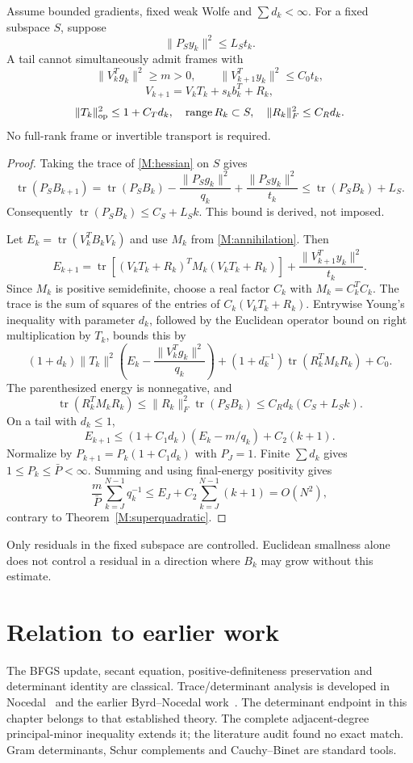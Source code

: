 \begin{theorem}\label{M:residualtheorem}
Assume bounded gradients, fixed weak Wolfe and $\sum d_k<\infty$. For a fixed subspace $S$, suppose
\[
 \|P_Sy_k\|^2\le L_St_k.
\]
A tail cannot simultaneously admit frames with
\[
 \|V_k^Tg_k\|^2\ge m>0,\qquad\|V_{k+1}^Ty_k\|^2\le C_0t_k,
\]
\[
 V_{k+1}=V_kT_k+s_kb_k^T+R_k,
\]
\[
 \|T_k\|_{\rm op}^2\le1+C_Td_k,\quad\operatorname{range}R_k\subset S,
 \quad\|R_k\|_F^2\le C_Rd_k.
\]
No full-rank frame or invertible transport is required.
\end{theorem}
\begin{proof}
Taking the trace of \eqref{M:hessian} on $S$ gives
\[
 \operatorname{tr}(P_SB_{k+1})
 =\operatorname{tr}(P_SB_k)-\frac{\|P_Sg_k\|^2}{q_k}
 +\frac{\|P_Sy_k\|^2}{t_k}
 \le\operatorname{tr}(P_SB_k)+L_S.
\]
Consequently $\operatorname{tr}(P_SB_k)\le C_S+L_Sk$. This bound is derived, not imposed.

Let $E_k=\operatorname{tr}(V_k^TB_kV_k)$ and use $M_k$ from \eqref{M:annihilation}. Then
\[
 E_{k+1}=\operatorname{tr}\!\left[(V_kT_k+R_k)^TM_k(V_kT_k+R_k)\right]
 +\frac{\|V_{k+1}^Ty_k\|^2}{t_k}.
\]
Since $M_k$ is positive semidefinite, choose a real factor $C_k$ with $M_k=C_k^TC_k$. The trace is the sum of squares of the entries of $C_k(V_kT_k+R_k)$. Entrywise Young's inequality with parameter $d_k$, followed by the Euclidean operator bound on right multiplication by $T_k$, bounds this by
\[
 (1+d_k)\|T_k\|^2\left(E_k-\frac{\|V_k^Tg_k\|^2}{q_k}\right)
 +(1+d_k^{-1})\operatorname{tr}(R_k^TM_kR_k)+C_0.
\]
The parenthesized energy is nonnegative, and
\[
 \operatorname{tr}(R_k^TM_kR_k)
 \le\|R_k\|_F^2\operatorname{tr}(P_SB_k)
 \le C_Rd_k(C_S+L_Sk).
\]
On a tail with $d_k\le1$,
\[
 E_{k+1}\le(1+C_1d_k)(E_k-m/q_k)+C_2(k+1).
\]
Normalize by $P_{k+1}=P_k(1+C_1d_k)$ with $P_J=1$. Finite $\sum d_k$ gives $1\le P_k\le\bar P<\infty$. Summing and using final-energy positivity gives
\[
 \frac m{\bar P}\sum_{k=J}^{N-1}q_k^{-1}
 \le E_J+C_2\sum_{k=J}^{N-1}(k+1)=O(N^2),
\]
contrary to Theorem~\ref{M:superquadratic}.
\end{proof}
Only residuals in the fixed subspace are controlled. Euclidean smallness alone does not control a residual in a direction where $B_k$ may grow without this estimate.


\section*{Relation to earlier work}
The BFGS update, secant equation, positive-definiteness preservation and determinant identity are classical. Trace/determinant analysis is developed in Nocedal~\cite[Section~5, equations (5.7), (5.15) and (5.21)]{FND_N92} and the earlier Byrd--Nocedal work~\cite{FND_BN89}. The determinant endpoint in this chapter belongs to that established theory. The complete adjacent-degree principal-minor inequality extends it; the literature audit found no exact match. Gram determinants, Schur complements and Cauchy--Binet are standard tools.

